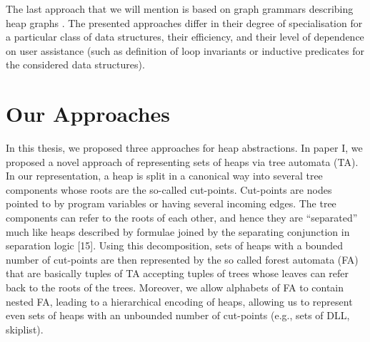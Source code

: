 The last approach that we will mention is based on graph grammars describing heap graphs \cite{Jonathan:Shape, Jonathan:Grammars}.  The presented approaches differ in their degree of specialisation for a particular class of data structures, their efficiency, and their level of dependence on user assistance (such as definition of loop invariants or inductive predicates for the considered data structures).
  
\section*{Our Approaches}
In this thesis, we proposed three approaches for heap abstractions. In paper I, we proposed a novel approach of representing sets of heaps via tree automata (TA). In our representation, a heap is split in a canonical way into several tree components whose roots are the so-called cut-points. Cut-points are nodes pointed to by program variables or having several incoming edges. The tree components can refer to the roots of each other, and hence they are “separated” much like heaps described by formulae joined by the separating conjunction in separation logic [15]. Using this decomposition, sets of heaps with a bounded number of cut-points are then represented by the so called forest automata (FA) that are basically tuples of TA accepting tuples of trees whose leaves can refer back to the roots of the trees. Moreover, we allow alphabets of FA to contain nested FA, leading to a hierarchical encoding of heaps, allowing us to represent even sets of heaps with an unbounded number of cut-points (e.g., sets of DLL, skiplist). 
